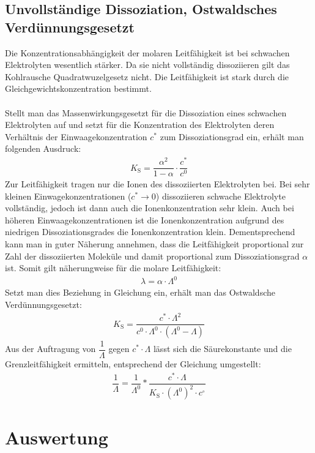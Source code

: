 \documentclass[12pt,a4paper,titlepage,headinclude,bibtotoc]{scrartcl}
\begin{document}
\subsection{Unvollständige Dissoziation, Ostwaldsches Verdünnungsgesetzt}
Die Konzentrationsabhängigkeit der molaren Leitfähigkeit ist bei schwachen Elektrolyten wesentlich stärker. Da sie nicht vollständig dissoziieren gilt das Kohlrausche Quadratwuzelgesetz nicht. Die Leitfähigkeit ist stark durch die Gleichgewichtskonzentration bestimmt.\\\\
Stellt man das Massenwirkungsgesetzt für die Dissoziation eines schwachen Elektrolyten auf und setzt für die Konzentration des Elektrolyten deren Verhältnis der Einwaagekonzentration $c^*$ zum Dissoziationsgrad ein, erhält man folgenden Ausdruck:
\begin{align}
K_\mathrm{S} = \dfrac{\alpha ^2}{1-\alpha } \cdot \dfrac{c^*}{c^0}
\end{align}
Zur Leitfähigkeit tragen nur die Ionen des dissoziierten Elektrolyten bei. Bei sehr kleinen Einwagekonzentrationen ($c^* \rightarrow 0$) dissoziieren schwache Elektrolyte vollständig, jedoch ist dann auch die Ionenkonzentration sehr klein. Auch bei höheren Einwaagekonzentrationen ist die Ionenkonzentration aufgrund des niedrigen Dissoziationsgrades die Ionenkonzentration klein. Dementsprechend kann man in guter Näherung annehmen, dass die Leitfähigkeit proportional zur Zahl der dissoziierten Moleküle und damit proportional zum Dissoziationsgrad $\alpha$ ist. Somit gilt näherungweise für die molare Leitfähigkeit:
\begin{align}
\lambda = \alpha \cdot \Lambda ^0 
\end{align}    
Setzt man dies Beziehung in Gleichung ein, erhält man das Ostwaldsche Verdünnungsgesetzt:
\begin{align}
K_\mathrm{S} = \dfrac{c^* \cdot \Lambda ^2}{c^0 \cdot \Lambda ^0 \cdot (\Lambda ^0 - \Lambda)}
\end{align} 
 Aus der Auftragung von $\dfrac{1}{\Lambda}$ gegen $c^* \cdot \Lambda$ lässt sich die Säurekonstante und die Grenzleitfähigkeit ermitteln, entsprechend der Gleichung umgestellt:
\begin{align}
\dfrac{1}{\Lambda} = \dfrac{1}{\Lambda ^0} * \dfrac{c^* \cdot \Lambda }{K_\mathrm{S} \cdot (\Lambda ^0)^2 \cdot c^\circ}
\end{align}






\section{Auswertung}
\end{document}
